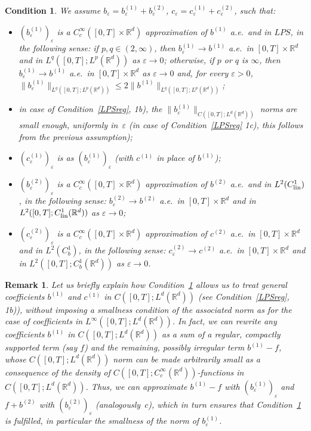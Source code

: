 \documentclass[a4paper,10pt]{article}
\newtheorem{condition}[theorem]{Condition}
\newtheorem{remark}[theorem]{Remark}
\newcommand\1{\mathbbm{1}}
\newcommand{\eps}{\varepsilon}
\newcommand\lin{{\rm lin}}
\numberwithin{equation}{section}
\begin{document}
\begin{condition}\label{LPSappprox}
We assume $b_\eps=b^{(1)}_\eps+b^{(2)}_\eps$, $c_\eps=c^{(1)}_\eps+c^{(2)}_\eps$, such that:
\begin{itemize}
\item $(b^{(1)}_\eps)_\eps$ is a $C^\infty_c([0,T]\times\mathbb{R}^d)$ approximation of $b^{(1)}$ a.e.~and in $LPS$, in the following sense: if $p,q \in (2,\infty)$, then $b^{(1)}_\eps\rightarrow b^{(1)}$ a.e.~in $[0,T]\times\mathbb{R}^d$ and in $L^q([0,T];L^p(\mathbb{R}^d))$ as $\eps\rightarrow0$; otherwise, if $p$ or $q$ is $\infty$, then $b^{(1)}_\eps\rightarrow b^{(1)}$ a.e.~in $[0,T]\times\mathbb{R}^d$ as $\eps\rightarrow0$ and, for every $\eps>0$, $\|b^{(1)}_\eps\|_{L^q([0,T];L^p(\mathbb{R}^d))}\le 2\|b^{(1)}\|_{L^q([0,T];L^p(\mathbb{R}^d))}$;
\item in case of Condition~\ref{LPSreg}, \textup{1b)}, the $\|b^{(1)}_\eps\|_{C([0,T];L^d(\mathbb{R}^d))}$ norms are small enough, uniformly in~$\eps$ \textup{(}in case of Condition~\ref{LPSreg} \textup{1c)}, this follows from the previous assumption\textup{)};
\item $(c^{(1)}_\eps)_\eps$ is as $(b^{(1)}_\eps)_\eps$ \textup{(}with $c^{(1)}$ in place of $b^{(1)}$\textup{)};
\item $(b^{(2)}_\eps)_\eps$ is a $C^\infty_c([0,T]\times\mathbb{R}^d)$ approximation of $b^{(2)}$ a.e.~and in $L^2(C^1_{\lin})$, in the following sense: $b^{(2)}_\eps\rightarrow b^{(2)}$ a.e.~in $[0,T]\times\mathbb{R}^d$ and in $L^2([0,T];C^1_{\lin}(\mathbb{R}^d))$ as $\eps\rightarrow0$;
\item $(c^{(2)}_\eps)_\eps$ is a $C^\infty_c([0,T]\times\mathbb{R}^d)$ approximation of $c^{(2)}$ a.e.~in $[0,T]\times\mathbb{R}^d$ and in $L^2(C^1_b)$, in the following sense: $c^{(2)}_\eps\rightarrow c^{(2)}$ a.e.~in $[0,T]\times\mathbb{R}^d$ and in $L^2([0,T];C^1_b(\mathbb{R}^d))$ as $\eps\rightarrow0$.
\end{itemize}
\end{condition}

\begin{remark}
Let us briefly explain how Condition~\ref{LPSappprox} allows us to treat general coefficients $b^{(1)}$ and $c^{(1)}$ in $C([0,T];L^d(\mathbb{R}^d))$ \textup{(}see Condition~\ref{LPSreg}, \textup{1b)}\textup{)}, without imposing a smallness condition of the associated norm as for the case of coefficients in $L^\infty([0,T];L^d(\mathbb{R}^d))$. In fact, we can rewrite any coefficients $b^{(1)}$ in $C([0,T];L^d(\mathbb{R}^d))$ as a sum of a regular, compactly supported term \textup{(}say $f$\textup{)} and the remaining, possibly irregular term $b^{(1)} - f$, whose $C([0,T];L^d(\mathbb{R}^d))$ norm can be made arbitrarily small as a consequence of the density of $C([0,T];C^\infty_c(\mathbb{R}^d))$-functions in $C([0,T];L^d(\mathbb{R}^d))$. Thus, we can approximate $b^{(1)} - f$ with $(b^{(1)}_\eps)_\eps$ and $f+b^{(2)}$ with $(b^{(2)}_\eps)_\eps$ \textup{(}analogously~$c$\textup{)}, which in turn ensures that Condition~\ref{LPSappprox} is fulfilled, in particular the smallness of the norm of $b^{(1)}_\eps$.
\end{remark}
\end{document}

